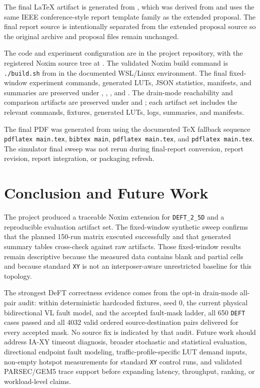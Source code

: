 \documentclass[conference]{IEEEtran}
\begin{document}
The final LaTeX artifact is generated from , which was derived from  and uses the same IEEE conference-style report template family as the extended proposal. The final report source is intentionally separated from the extended proposal source so the original archive and proposal files remain unchanged.

The code and experiment configuration are in the project repository, with the registered Noxim source tree at . The validated Noxim build command is \texttt{./build.sh} from  in the documented WSL/Linux environment. The final fixed-window experiment commands, generated LUTs, JSON statistics, manifests, and summaries are preserved under , , , and . The drain-mode reachability and comparison artifacts are preserved under  and ; each artifact set includes the relevant commands, fixtures, generated LUTs, logs, summaries, and manifests.

The final PDF was generated from  using the documented TeX fallback sequence \texttt{pdflatex main.tex}, \texttt{bibtex main}, \texttt{pdflatex main.tex}, and \texttt{pdflatex main.tex}. The simulator final sweep was not rerun during final-report conversion, report revision, report integration, or packaging refresh.

\section{Conclusion and Future Work}

The project produced a traceable Noxim extension for \texttt{DEFT\_2\_5D} and a reproducible evaluation artifact set. The fixed-window synthetic sweep confirms that the planned 150-run matrix executed successfully and that generated summary tables cross-check against raw artifacts. Those fixed-window results remain descriptive because the measured data contains blank and partial cells and because standard \texttt{XY} is not an interposer-aware unrestricted baseline for this topology.

The strongest DeFT correctness evidence comes from the opt-in drain-mode all-pair audit: within deterministic hardcoded fixtures, seed 0, the current physical bidirectional VL fault model, and the accepted fault-mask ladder, all 650 \texttt{DEFT} cases passed and all 4032 valid ordered source-destination pairs delivered for every accepted mask. No source fix is indicated by that audit. Future work should address IA-XY timeout diagnosis, broader stochastic and statistical evaluation, directional endpoint fault modeling, traffic-profile-specific LUT demand inputs, non-empty hotspot measurements for standard \texttt{XY} control runs, and validated PARSEC/GEM5 trace support before expanding latency, throughput, ranking, or workload-level claims.



\end{document}
